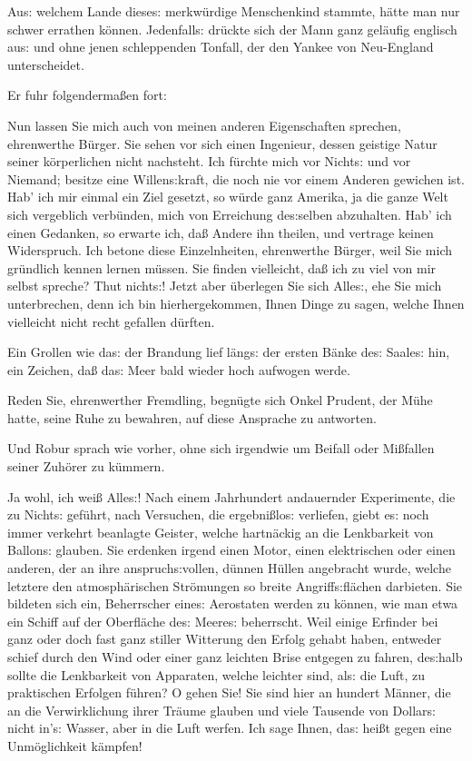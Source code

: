 \documentclass[oneside,12pt]{book}
\newcommand{\s}{s:}
\begin{document}
Au{\s} welchem Lande diese{\s} merkw\"urdige Menschenkind stammte,
h\"atte man nur schwer errathen k\"onnen. Jedenfall{\s} dr\"uckte
sich der Mann ganz gel\"aufig englisch au{\s} und ohne jenen
schleppenden Tonfall, der den Yankee von Neu-England unterscheidet.

Er fuhr folgenderma{\ss}en fort:

{\glqq}Nun lassen Sie mich auch von meinen anderen Eigenschaften
sprechen, ehrenwerthe B\"urger. Sie sehen vor sich einen Ingenieur,
dessen geistige Natur seiner k\"orperlichen nicht nachsteht. Ich
f\"urchte mich vor Nicht{\s} und vor Niemand; besitze eine
Willen{\s}kraft, die noch nie vor einem Anderen gewichen ist. Hab'
ich mir einmal ein Ziel gesetzt, so w\"urde ganz Amerika, ja die
ganze Welt sich vergeblich verb\"unden, mich von Erreichung
de{\s}selben abzuhalten. Hab' ich einen Gedanken, so erwarte ich,
da{\ss} Andere ihn theilen, und vertrage keinen Widerspruch. Ich
betone diese Einzelnheiten, ehrenwerthe B\"urger, weil Sie mich
gr\"undlich kennen lernen m\"ussen. Sie finden vielleicht, da{\ss}
ich zu viel von mir selbst spreche? Thut nicht{\s}! Jetzt aber
\"uberlegen Sie sich Alle{\s}, ehe Sie mich unterbrechen, denn ich
bin hierhergekommen, Ihnen Dinge zu sagen, welche Ihnen vielleicht
nicht recht gefallen d\"urften.{\grqq}

Ein Grollen wie da{\s} der Brandung lief l\"ang{\s} der ersten
B\"anke de{\s} Saale{\s} hin, ein Zeichen, da{\ss} da{\s} Meer bald
wieder hoch aufwogen werde.

{\glqq}Reden Sie, ehrenwerther Fremdling,{\grqq} begn\"ugte sich
Onkel Prudent, der M\"uhe hatte, seine Ruhe zu bewahren, auf diese
Ansprache zu antworten.

Und Robur sprach wie vorher, ohne sich irgendwie um Beifall oder
Mi{\ss}fallen seiner Zuh\"orer zu k\"ummern.

{\glqq}Ja wohl, ich wei{\ss} Alle{\s}! Nach einem Jahrhundert
andauernder Experimente, die zu Nicht{\s} gef\"uhrt, nach Versuchen,
die ergebni{\ss}lo{\s} verliefen, giebt e{\s} noch immer verkehrt
beanlagte Geister, welche hartn\"ackig an die Lenkbarkeit von
Ballon{\s} glauben. Sie erdenken irgend einen Motor, einen
elektrischen oder einen anderen, der an ihre anspruch{\s}vollen,
d\"unnen H\"ullen angebracht wurde, welche letztere den
atmosph\"arischen Str\"omungen so breite Angriff{\s}fl\"achen
darbieten. Sie bildeten sich ein, Beherrscher eine{\s} Aerostaten
werden zu k\"onnen, wie man etwa ein Schiff auf der Oberfl\"ache
de{\s} Meere{\s} beherrscht. Weil einige Erfinder bei ganz oder doch
fast ganz stiller Witterung den Erfolg gehabt haben, entweder schief
durch den Wind oder einer ganz leichten Brise entgegen zu fahren,
de{\s}halb sollte die Lenkbarkeit von Apparaten, welche leichter
sind, al{\s} die Luft, zu praktischen Erfolgen f\"uhren? O gehen Sie!
Sie sind hier an hundert M\"anner, die an die Verwirklichung ihrer
Tr\"aume glauben und viele Tausende von Dollar{\s} nicht in'{\s}
Wasser, aber in die Luft werfen. Ich sage Ihnen, da{\s} hei{\ss}t
gegen eine Unm\"oglichkeit k\"ampfen!{\grqq}
\end{document}
